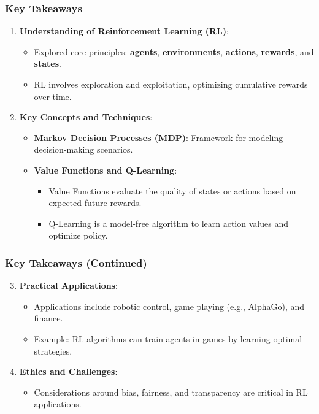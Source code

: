 \documentclass[aspectratio=169]{beamer}
\begin{document}
\begin{frame}
    \frametitle{Key Takeaways}
    \begin{enumerate}
        \item \textbf{Understanding of Reinforcement Learning (RL)}:
        \begin{itemize}
            \item Explored core principles: \textbf{agents}, \textbf{environments}, \textbf{actions}, \textbf{rewards}, and \textbf{states}.
            \item RL involves exploration and exploitation, optimizing cumulative rewards over time.
        \end{itemize}
        \item \textbf{Key Concepts and Techniques}:
        \begin{itemize}
            \item \textbf{Markov Decision Processes (MDP)}: Framework for modeling decision-making scenarios.
            \item \textbf{Value Functions and Q-Learning}:
            \begin{itemize}
                \item Value Functions evaluate the quality of states or actions based on expected future rewards.
                \item Q-Learning is a model-free algorithm to learn action values and optimize policy.
            \end{itemize}
        \end{itemize}
    \end{enumerate}
\end{frame}

\begin{frame}[fragile]
    \frametitle{Key Takeaways (Continued)}
    \begin{enumerate}
        \setcounter{enumi}{2}
        \item \textbf{Practical Applications}:
        \begin{itemize}
            \item Applications include robotic control, game playing (e.g., AlphaGo), and finance.
            \item Example: RL algorithms can train agents in games by learning optimal strategies.
        \end{itemize}
        \item \textbf{Ethics and Challenges}:
        \begin{itemize}
            \item Considerations around bias, fairness, and transparency are critical in RL applications.
        \end{itemize}
    \end{enumerate}
\end{frame}
\end{document}
